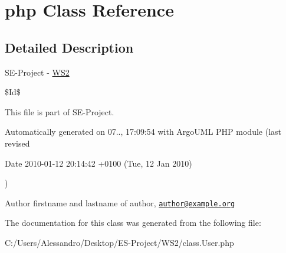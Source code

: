 \hypertarget{class_1_1_user_1_1php}{\section{php Class Reference}
\label{class_1_1_user_1_1php}
}


\subsection{Detailed Description}
S\+E-\/\+Project -\/ \hyperlink{namespace_w_s2}{W\+S2}

\$\+Id\$

This file is part of S\+E-\/\+Project.

Automatically generated on 07.., 17\+:09\+:54 with Argo\+U\+M\+L P\+H\+P module (last revised \begin{DoxyParagraph}{Date}
2010-\/01-\/12 20\+:14\+:42 +0100 (Tue, 12 Jan 2010) 
\end{DoxyParagraph}
)

\begin{DoxyAuthor}{Author}
firstname and lastname of author, \href{mailto:author@example.org}{\tt author@example.\+org} 
\end{DoxyAuthor}


The documentation for this class was generated from the following file\+:\begin{DoxyCompactItemize}
\item 
C\+:/\+Users/\+Alessandro/\+Desktop/\+E\+S-\/\+Project/\+W\+S2/class.\+User.\+php\end{DoxyCompactItemize}
